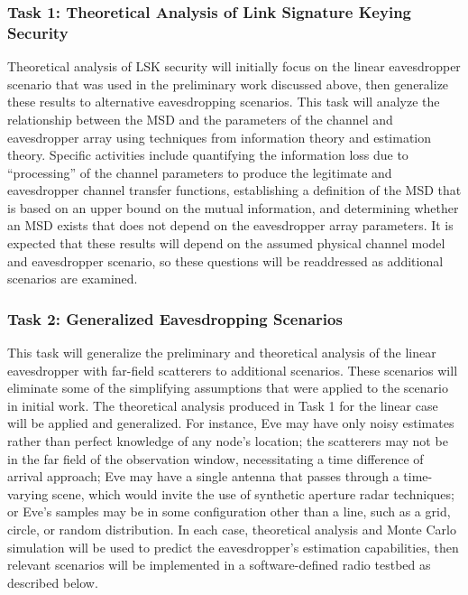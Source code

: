 \documentclass[12pt, titlepage]{article}
\begin{document}
\subsubsection*{Task 1: Theoretical Analysis of Link Signature Keying Security}
Theoretical analysis of LSK security will initially focus on the linear eavesdropper scenario that was used in the preliminary work discussed above, then generalize these results to alternative eavesdropping scenarios.  This task will analyze the relationship between the MSD and the parameters of the channel and eavesdropper array using techniques from information theory and estimation theory.  Specific activities include quantifying the information loss due to ``processing'' of the channel parameters to produce the legitimate and eavesdropper channel transfer functions, establishing a definition of the MSD that is based on an upper bound on the mutual information, and determining whether an MSD exists that does not depend on the eavesdropper array parameters.  It is expected that these results will depend on the assumed physical channel model and eavesdropper scenario, so these questions will be readdressed as additional scenarios are examined.

\subsubsection*{Task 2: Generalized Eavesdropping Scenarios}
This task will generalize the preliminary and theoretical analysis of the linear eavesdropper with far-field scatterers to additional scenarios.  These scenarios will eliminate some of the simplifying assumptions that were applied to the scenario in initial work.  The theoretical analysis produced in Task 1 for the linear case will be applied and generalized.  For instance, Eve may have only noisy estimates rather than perfect knowledge of any node's location; the scatterers may not be in the far field of the observation window, necessitating a time difference of arrival approach; Eve may have a single antenna that passes through a time-varying scene, which would invite the use of synthetic aperture radar techniques; or Eve's samples may be in some configuration other than a line, such as a grid, circle, or random distribution.  In each case, theoretical analysis and Monte Carlo simulation will be used to predict the eavesdropper's estimation capabilities, then relevant scenarios will be implemented in a software-defined radio testbed as described below.
\end{document}
